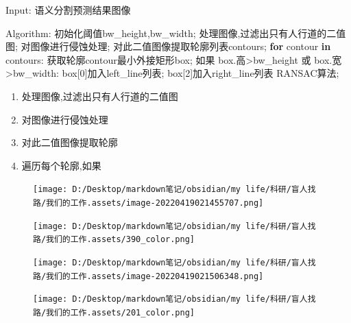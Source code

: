 \documentclass[]{article}
\newenvironment{Shaded}{}{}
\newcommand{\ControlFlowTok}[1]{\textcolor[rgb]{0.00,0.44,0.13}{\textbf{#1}}}
\newcommand{\DecValTok}[1]{\textcolor[rgb]{0.25,0.63,0.44}{#1}}
\newcommand{\KeywordTok}[1]{\textcolor[rgb]{0.00,0.44,0.13}{\textbf{#1}}}
\newcommand{\NormalTok}[1]{#1}
\newcommand{\OperatorTok}[1]{\textcolor[rgb]{0.40,0.40,0.40}{#1}}
\begin{document}
\begin{Shaded}
\begin{Highlighting}[]
\NormalTok{Input:}
\NormalTok{	语义分割预测结果图像}

\NormalTok{Algorithm:}
\NormalTok{    初始化阈值bw_height,bw_width}\OperatorTok{;}
\NormalTok{	处理图像,过滤出只有人行道的二值图}\OperatorTok{;}
\NormalTok{	对图像进行侵蚀处理}\OperatorTok{;}
\NormalTok{	对此二值图像提取轮廓列表contours}\OperatorTok{;}
	\ControlFlowTok{for}\NormalTok{ contour }\KeywordTok{in}\NormalTok{ contours:}
\NormalTok{        获取轮廓contour最小外接矩形box}\OperatorTok{;}
\NormalTok{        如果 box.高}\OperatorTok{>}\NormalTok{bw_height 或 box.宽}\OperatorTok{>}\NormalTok{bw_width:}
\NormalTok{            box[}\DecValTok{0}\NormalTok{]加入left_line列表}\OperatorTok{;}            
\NormalTok{            box[}\DecValTok{2}\NormalTok{]加入right_line列表}
\NormalTok{	RANSAC算法}\OperatorTok{;}
               
\end{Highlighting}
\end{Shaded}

\begin{enumerate}
\def\labelenumi{\arabic{enumi}.}
\item
  处理图像,过滤出只有人行道的二值图
\item
  对图像进行侵蚀处理
\item
  对此二值图像提取轮廓
\item
  遍历每个轮廓,如果
\end{enumerate}

\begin{figure}
\centering
\texttt{[image: D:/Desktop/markdown笔记/obsidian/my life/科研/盲人找路/我们的工作.assets/image-20220419021455707.png]}
\caption{}
\end{figure}

\begin{figure}
\centering
\texttt{[image: D:/Desktop/markdown笔记/obsidian/my life/科研/盲人找路/我们的工作.assets/390\_color.png]}
\caption{}
\end{figure}

\begin{figure}
\centering
\texttt{[image: D:/Desktop/markdown笔记/obsidian/my life/科研/盲人找路/我们的工作.assets/image-20220419021506348.png]}
\caption{}
\end{figure}

\begin{figure}
\centering
\texttt{[image: D:/Desktop/markdown笔记/obsidian/my life/科研/盲人找路/我们的工作.assets/201\_color.png]}
\caption{}
\end{figure}
\end{document}
